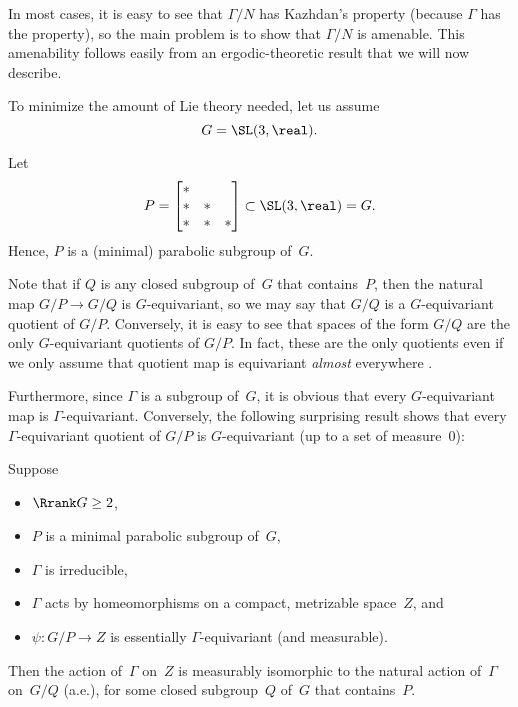 In most cases, it is easy to see that $\Gamma/N$ has Kazhdan's property (because $\Gamma$ has the property), so the main problem is to show that $\Gamma/N$ is amenable. This amenability follows easily from an ergodic-theoretic result that we will now describe. 

\begin{assump}
To minimize the amount of Lie theory needed, let us assume 
	$$G = \SL(3,\real) .$$
\end{assump}

\begin{notation} \label{MargNormalP=upper}
Let 
	$$P = \begin{bmatrix}  *&& \\ *&*& \\ *&*&* \end{bmatrix} \subset \SL(3,\real) = G .$$
Hence, $P$ is a (minimal) parabolic subgroup of~$G$.
\end{notation}

Note that if $Q$ is any closed subgroup of~$G$ that contains~$P$, then the natural map $G/P \to G/Q$ is $G$-equivariant, so we may say that $G/Q$ is a $G$-equivariant quotient of $G/P$. Conversely, it is easy to see that spaces of the form $G/Q$ are the only $G$-equivariant quotients of $G/P$. In fact, these are the only quotients even if we only assume that quotient map is equivariant \emph{almost} everywhere .

Furthermore, since $\Gamma$ is a subgroup of~$G$, it is obvious that every $G$-equivariant map is $\Gamma$-equivariant. Conversely, the following surprising result shows that every $\Gamma$-equivariant quotient of $G/P$ is $G$-equivariant (up to a set of measure~$0$):

\begin{thm}[(Margulis)] \label{blackbox} Suppose
\noprelistbreak
\begin{itemize}
\item $\Rrank G \ge 2$,
\item $P$ is a minimal parabolic subgroup of~$G$,
\item $\Gamma$ is irreducible,
\item $\Gamma$ acts by homeomorphisms on a compact, metrizable space~$Z$,
and
\item  $\psi \colon G/P \to Z$ is essentially\/ $\Gamma$-equivariant\/ \textup(and measurable\/\textup).
\end{itemize}
Then the action of\/~$\Gamma$ on~$Z$ is measurably isomorphic to the natural action of\/~$\Gamma$ on~$G/Q$\/ \textup(a.e.\textup), for some closed subgroup~$Q$ of~$G$ that contains~$P$.
\end{thm}

